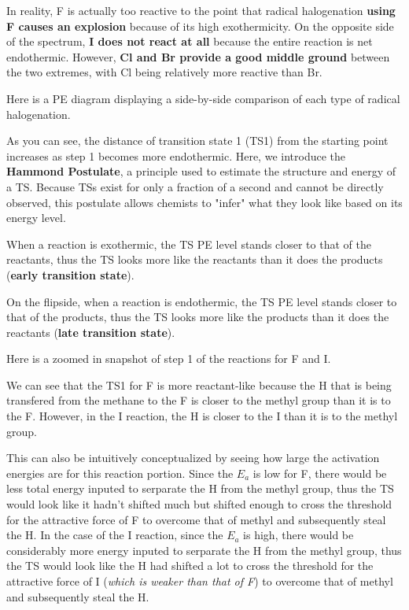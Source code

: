 \documentclass[10pt]{article}
\begin{document}
  In reality, F is actually too reactive to the point that radical halogenation \textbf{using F causes an explosion} because of its high exothermicity. On the opposite side of the spectrum, \textbf{I does not react at all} because the entire reaction is net endothermic. However, \textbf{Cl and Br provide a good middle ground} between the two extremes, with Cl being relatively more reactive than Br.

  Here is a PE diagram displaying a side-by-side comparison of each type of radical halogenation.


  As you can see, the distance of transition state 1 (TS1) from the starting point increases as step 1 becomes more endothermic. Here, we introduce the \textbf{Hammond Postulate}, a principle used to estimate the structure and energy of a TS. Because TSs exist for only a fraction of a second and cannot be directly observed, this postulate allows chemists to "infer" what they look like based on its energy level.

  When a reaction is exothermic, the TS PE level stands closer to that of the reactants, thus the TS looks more like the reactants than it does the products (\textbf{early transition state}). 

  On the flipside, when a reaction is endothermic, the TS PE level stands closer to that of the products, thus the TS looks more like the products than it does the reactants (\textbf{late transition state}).

  Here is a zoomed in snapshot of step 1 of the reactions for F and I.
  

  We can see that the TS1 for F is more reactant-like because the H that is being transfered from the methane to the F is closer to the methyl group than it is to the F. However, in the I reaction, the H is closer to the I than it is to the methyl group.
  
  This can also be intuitively conceptualized by seeing how large the activation energies are for this reaction portion. Since the $E_a$ is low for F, there would be less total energy inputed to serparate the H from the methyl group, thus the TS would look like it hadn't shifted much but shifted enough to cross the threshold for the attractive force of F to overcome that of methyl and subsequently steal the H. In the case of the I reaction, since the $E_a$ is high, there would be considerably more energy inputed to serparate the H from the methyl group, thus the TS would look like the H had shifted a lot to cross the threshold for the attractive force of I (\textit{which is weaker than that of F}) to overcome that of methyl and subsequently steal the H.
\end{document}
